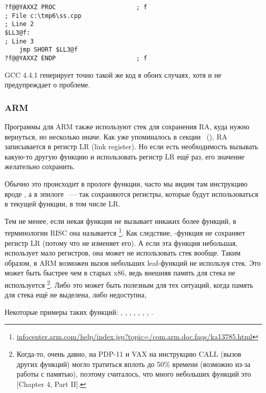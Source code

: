 \begin{lstlisting}
?f@@YAXXZ PROC						; f
; File c:\tmp6\ss.cpp
; Line 2
$LL3@f:
; Line 3
	jmp	SHORT $LL3@f
?f@@YAXXZ ENDP						; f
\end{lstlisting}

GCC 4.4.1 генерирует точно такой же код в обоих случаях, хотя и не предупреждает о проблеме.

\subsubsection{ARM}

Программы для ARM также используют стек для сохранения \ac{RA}, куда нужно вернуться, но несколько иначе.
Как уже упоминалось в секции \q{\HelloWorldSectionName}~(),
\ac{RA} записывается в регистр \ac{LR} (\gls{link register}).
Но если есть необходимость вызывать какую-то другую функцию и использовать регистр \ac{LR} ещё
раз, его значение желательно сохранить.

Обычно это происходит в прологе функции, часто мы видим там инструкцию вроде , а в эпилоге
~--- так сохраняются регистры, которые будут использоваться в текущей функции, в том числе \ac{LR}.

Тем не менее, если некая функция не вызывает никаких более функций, в терминологии \ac{RISC} она называется
\footnote{\href{http://go.yurichev.com/17064}{infocenter.arm.com/help/index.jsp?topic=/com.arm.doc.faqs/ka13785.html}}. 
Как следствие, -функция не сохраняет регистр \ac{LR} (потому что не изменяет его).
А если эта функция небольшая, использует мало регистров, она может не использовать стек вообще.
Таким образом, в ARM возможен вызов небольших leaf-функций не используя стек.
Это может быть быстрее чем в старых x86, ведь внешняя память для стека не используется
\footnote{Когда-то, очень давно, на PDP-11 и VAX на инструкцию CALL (вызов других функций) могло тратиться
вплоть до 50\% времени (возможно из-за работы с памятью),
поэтому считалось, что много небольших функций это 
[\TAOUP Chapter 4, Part II].}.
Либо это может быть полезным для тех ситуаций, когда память для стека ещё не выделена, либо недоступна,

Некоторые примеры таких функций:
, , 
, , ,
, , .

